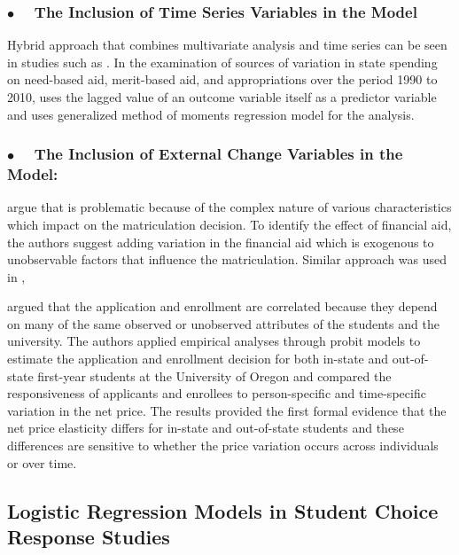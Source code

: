 \documentclass[12pt,english]{report}
\begin{document}
\subsubsection{$\bullet \quad$  The Inclusion of Time Series Variables in the Model}  Hybrid approach that combines multivariate analysis and time series can be seen in studies such as \citet{Heller1999}. In the examination of sources of variation in state spending on need-based aid, merit-based aid, and appropriations over the period 1990 to 2010, \citep{McLendon2014} uses the lagged value of an outcome variable itself as a predictor variable and uses generalized method of moments regression model for the analysis.

\subsubsection{$\bullet \quad$  The Inclusion of External Change Variables in the Model:} 

\citet{Dynarski2003} argue that  is problematic because of the complex nature of various characteristics which impact on the matriculation decision. To identify the effect of financial aid, the authors suggest adding variation in the financial aid which is exogenous to unobservable factors that influence the matriculation.  Similar approach was used in \citep{Dynarski2003, Abraham2006},

\citet{Curs2002} argued that the application and enrollment are correlated because they depend on many of the same observed or unobserved attributes of the students and the university.  The authors applied empirical analyses through probit models to estimate the application and enrollment decision for both in-state and out-of-state first-year students at the University of Oregon and compared the responsiveness of applicants and enrollees to person-specific and time-specific variation in the net price.   The results provided the first formal evidence that the net price elasticity differs for in-state and out-of-state students and these differences are sensitive to whether the price variation occurs across individuals or over time.

\subsection{Logistic Regression Models in Student Choice Response Studies}
\end{document}
